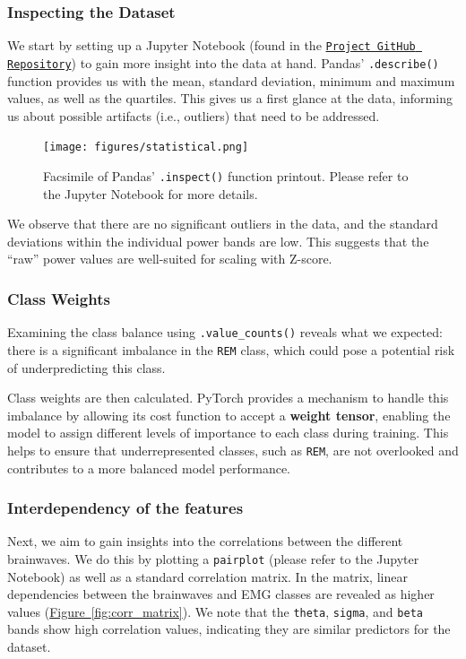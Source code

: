\documentclass{article}
\begin{document}
\begin{multicols}{2}
\subsubsection*{Inspecting the Dataset}
We start by setting up a Jupyter Notebook (found in the \href{https://github.com/EOH-ML/FYS-STK3155-Projects/tree/main/project3}{\texttt{Project GitHub Repository}}) to gain more insight into the data at hand. Pandas' \texttt{.describe()} function \cite{mckinney_data_2010} provides us with the mean, standard deviation, minimum and maximum values, as well as the quartiles. This gives us a first glance at the data, informing us about possible artifacts (i.e., outliers) that need to be addressed. 
\begin{figure}[H]
    \centering
    \texttt{[image: figures/statistical.png]} 
    \caption{Facsimile of Pandas' \texttt{.inspect()} function printout. Please refer to the Jupyter Notebook for more details.}
    \label{fig:statistic}
\end{figure}

We observe that there are no significant outliers in the data, and the standard deviations within the individual power bands are low. This suggests that the ``raw'' power values are well-suited for scaling with Z-score.

\subsubsection*{Class Weights}
Examining the class balance using \texttt{.value\_counts()} \cite{mckinney_data_2010} reveals what we expected: there is a significant imbalance in the \texttt{REM} class, which could pose a potential risk of underpredicting this class.

Class weights are then calculated. PyTorch provides a mechanism to handle this imbalance by allowing its cost function to accept a \textbf{weight tensor}, enabling the model to assign different levels of importance to each class during training. This helps to ensure that underrepresented classes, such as \texttt{REM}, are not overlooked and contributes to a more balanced model performance.

\subsubsection*{Interdependency of the features}
Next, we aim to gain insights into the correlations between the different brainwaves. We do this by plotting a \texttt{pairplot} (please refer to the Jupyter Notebook) \cite{waskom_seaborn_2021} as well as a standard correlation matrix. In the matrix, linear dependencies between the brainwaves and EMG classes are revealed as higher values (\hyperref[fig:corr_matrix]{Figure~\ref*{fig:corr_matrix}}). We note that the \texttt{theta}, \texttt{sigma}, and \texttt{beta} bands show high correlation values, indicating they are similar predictors for the dataset.


\end{multicols}
\end{document}
